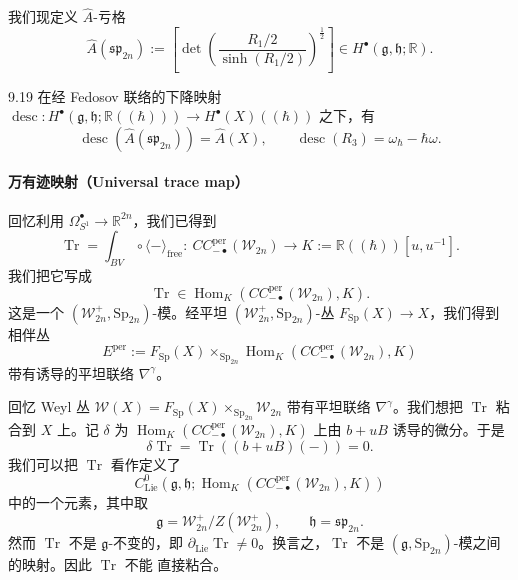 我们现定义 $\widehat{A}$-亏格
\[
  \widehat{A}(\mathfrak{sp}_{2n}):=\left[\det\left(\frac{R_1/2}
  {\sinh(R_1/2)}\right)^{\frac{1}{2}}\right]\in H^\bullet(\mathfrak{g},\mathfrak{h};\mathbb{R}).
\]

\begin{wprop}{9.19}
  在经 Fedosov 联络的下降映射
  $\operatorname{desc}:H^\bullet(\mathfrak{g},\mathfrak{h};\mathbb{R}((\hbar)))
  \to H^\bullet(X)((\hbar))$ 之下，有
  \[
    \operatorname{desc}\left(\widehat{A}(\mathfrak{sp}_{2n})\right)=\widehat{A}(X),
    \qquad
    \operatorname{desc}(R_3)=\omega_\hbar-\hbar\omega.
  \]
\end{wprop}


\paragraph*{万有迹映射（Universal trace map）}

回忆利用 $\Omega^\bullet_{S^1}\to\mathbb{R}^{2n}$，我们已得到
\[
  \operatorname{Tr}=\int_{BV}\circ\langle-\rangle_{\mathrm{free}}:\
  CC^{\mathrm{per}}_{-\bullet}(\mathcal{W}_{2n})\longrightarrow
  K:=\mathbb{R}((\hbar))[u,u^{-1}].
\]
我们把它写成
\[
  \operatorname{Tr}\in\operatorname{Hom}_K\left(CC^{\mathrm{per}}_{-\bullet}
  (\mathcal{W}_{2n}),K\right).
\]
这是一个 $(\mathcal{W}^+_{2n},\mathrm{Sp}_{2n})$-模。经平坦
$(\mathcal{W}^+_{2n},\mathrm{Sp}_{2n})$-丛 $F_{\mathrm{Sp}}(X)\to X$，我们得到
相伴丛
\[
  E^{\mathrm{per}}:=F_{\mathrm{Sp}}(X)\times_{\mathrm{Sp}_{2n}}
  \operatorname{Hom}_K\left(CC^{\mathrm{per}}_{-\bullet}(\mathcal{W}_{2n}),K\right)
\]
带有诱导的平坦联络 $\nabla^\gamma$。

回忆 Weyl 丛 $\mathcal{W}(X)=F_{\mathrm{Sp}}(X)\times_{\mathrm{Sp}_{2n}}
\mathcal{W}_{2n}$ 带有平坦联络 $\nabla^\gamma$。我们想把 $\operatorname{Tr}$
粘合到 $X$ 上。记 $\delta$ 为 $\operatorname{Hom}_K\left(CC^{\mathrm{per}}_{-\bullet}
(\mathcal{W}_{2n}),K\right)$ 上由 $b+uB$ 诱导的微分。于是
\[
  \delta\operatorname{Tr}=\operatorname{Tr}\left((b+uB)(-)\right)=0.
\]
我们可以把 $\operatorname{Tr}$ 看作定义了
\[
  C^0_{\mathrm{Lie}}\left(\mathfrak{g},\mathfrak{h};\operatorname{Hom}_K
  \left(CC^{\mathrm{per}}_{-\bullet}(\mathcal{W}_{2n}),K\right)\right)
\]
中的一个元素，其中取
\[
  \mathfrak{g}=\mathcal{W}^+_{2n}/Z(\mathcal{W}^+_{2n}),\qquad
  \mathfrak{h}=\mathfrak{sp}_{2n}.
\]
然而 $\operatorname{Tr}$ 不是 $\mathfrak{g}$-不变的，即
$\partial_{\mathrm{Lie}}\operatorname{Tr}\neq0$。换言之，$\operatorname{Tr}$ 不是
$(\mathfrak{g},\mathrm{Sp}_{2n})$-模之间的映射。因此 $\operatorname{Tr}$ 不能
直接粘合。

